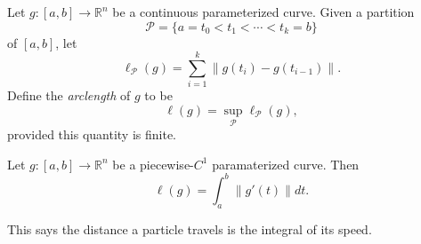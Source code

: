 \documentclass[12pt]{article}
\begin{document}
\begin{definition}
	Let $g:[a,b]\to\mathbb{R}^n$ be a continuous parameterized curve. Given a partition 
	\begin{equation*}
		\mathcal{P}=\{a=t_0<t_1<\cdots <t_k =b\}
	\end{equation*}
	of $[a,b]$, let 
	\begin{equation*}
		\ell_\mathcal{P}(g) = \sum_{i=1}^k \|g(t_i)-g(t_{i-1})\|.
	\end{equation*}
	Define the \emph{arclength} of $g$ to be 
	\begin{equation*}
		\ell(g) = \sup_\mathcal{P} \ell_\mathcal{P}(g),
	\end{equation*}
	provided this quantity is finite.
\end{definition}

\begin{proposition}
	Let $g:[a,b]\to\mathbb{R}^n$ be a piecewise-$C^1$ paramaterized curve. Then 
	\begin{equation*}
		\ell(g) = \int_a^b \|g'(t)\|dt.
	\end{equation*}
\end{proposition}
\begin{remark}
	This says the distance a particle travels is the integral of its speed.
\end{remark}
\end{document}
